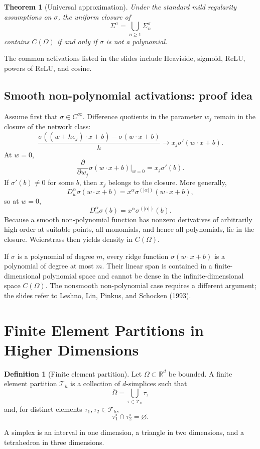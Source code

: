 \documentclass[11pt,a4paper]{article}
\newcommand{\R}{\mathbb{R}}
\newcommand{\Th}{\mathcal{T}_h}
\theoremstyle{definition}
\newtheorem{definition}{Definition}[section]
\theoremstyle{plain}
\newtheorem{theorem}{Theorem}[section]
\theoremstyle{remark}
\begin{document}
\begin{theorem}[Universal approximation]
Under the standard mild regularity assumptions on $\sigma$, the uniform closure of
\[
  \Sigma^\sigma=\bigcup_{n\ge1}\Sigma_n^\sigma
\]
contains $C(\Omega)$ if and only if $\sigma$ is not a polynomial.
\end{theorem}

The common activations listed in the slides include Heaviside, sigmoid, ReLU, powers of ReLU, and cosine.

\subsection{Smooth non-polynomial activations: proof idea}
Assume first that $\sigma\in C^\infty$. Difference quotients in the parameter $w_j$ remain in the closure of the network class:
\[
  \frac{\sigma((w+he_j)\cdot x+b)-\sigma(w\cdot x+b)}{h}
  \longrightarrow
  x_j\sigma'(w\cdot x+b).
\]
At $w=0$,
\[
  \frac{\partial}{\partial w_j}\sigma(w\cdot x+b)\bigg|_{w=0}
  =x_j\sigma'(b).
\]
If $\sigma'(b)\ne0$ for some $b$, then $x_j$ belongs to the closure. More generally,
\[
  D_w^\alpha\sigma(w\cdot x+b)
  =x^\alpha\sigma^{(|\alpha|)}(w\cdot x+b),
\]
so at $w=0$,
\[
  D_w^\alpha\sigma(b)=x^\alpha\sigma^{(|\alpha|)}(b).
\]
Because a smooth non-polynomial function has nonzero derivatives of arbitrarily high order at suitable points, all monomials, and hence all polynomials, lie in the closure. Weierstrass then yields density in $C(\Omega)$.

If $\sigma$ is a polynomial of degree $m$, every ridge function $\sigma(w\cdot x+b)$ is a polynomial of degree at most $m$. Their linear span is contained in a finite-dimensional polynomial space and cannot be dense in the infinite-dimensional space $C(\Omega)$. The nonsmooth non-polynomial case requires a different argument; the slides refer to Leshno, Lin, Pinkus, and Schocken (1993).

\section{Finite Element Partitions in Higher Dimensions}

\begin{definition}[Finite element partition]
Let $\Omega\subset\R^d$ be bounded. A finite element partition $\Th$ is a collection of $d$-simplices such that
\[
  \overline\Omega=\bigcup_{\tau\in\Th}\tau,
\]
and, for distinct elements $\tau_1,\tau_2\in\Th$,
\[
  \tau_1^\circ\cap\tau_2^\circ=\varnothing.
\]
\end{definition}
A simplex is an interval in one dimension, a triangle in two dimensions, and a tetrahedron in three dimensions.
\end{document}
